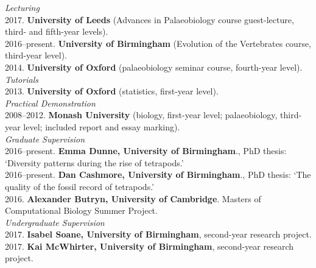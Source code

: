 \documentclass[a4paper, oneside, final]{scrartcl} %
\begin{document}
\begin{center}
\begin{flushleft}
\begin{flushleft}
{\large\emph{Lecturing}}\\
2017. \textbf{University of Leeds} (Advances in Palaeobiology course guest-lecture, third- and fifth-year levels).\\
2016--present. \textbf{University of Birmingham} (Evolution of the Vertebrates course, third-year level).\\
2014. \textbf{University of Oxford} (palaeobiology seminar course, fourth-year level).\\
\vspace{6pt}
{\large\emph{Tutorials}}\\
2013. \textbf{University of Oxford} (statistics, first-year level).\\
\vspace{6pt}
{\large\emph{Practical Demonstration}}\\
2008--2012. \textbf{Monash University} (biology, first-year level; palaeobiology, third-year level; included report and essay marking).\\
\vspace{6pt}
{\large\emph{Graduate Supervision}}\\
2016--present. \textbf{Emma Dunne, University of Birmingham}., PhD thesis: `Diversity patterns during the rise of tetrapods.'\\ 
2016--present. \textbf{Dan Cashmore, University of Birmingham}., PhD thesis: `The quality of the fossil record of tetrapods.'\\
2016. \textbf{Alexander Butryn, University of Cambridge}. Masters of Computational Biology Summer Project.\\
\vspace{6pt}
{\large\emph{Undergraduate Supervision}}\\
2017. \textbf{Isabel Soane, University of Birmingham}, second-year research project.\\
2017. \textbf{Kai McWhirter, University of Birmingham}, second-year research project.\\
\end{flushleft}




\end{flushleft}
\end{center}
\end{document}
